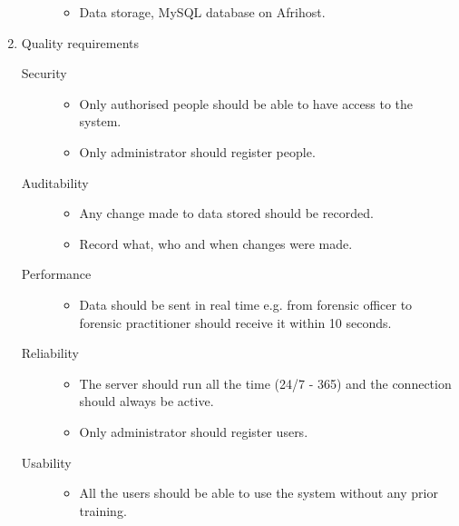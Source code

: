 \documentclass[10pt,a4paper]{article}
\begin{document}
\begin{enumerate}
\begin{description}
\begin{itemize}
\item Data storage, MySQL database on Afrihost.
\end{itemize}

\end{description}


\item Quality requirements

\begin{description}
\item [Security]

\begin{itemize}
\item Only authorised people should be able to have access to the system.
\item Only administrator should register people.
\end{itemize}

\item [Auditability]

\begin{itemize}
\item Any change made to data stored should be recorded.
\item Record what, who and when changes were made.
\end{itemize}

\item [Performance]

\begin{itemize}
\item Data should be sent in real time e.g. from forensic officer to forensic practitioner should receive it within 10 seconds.
\end{itemize}

\item [Reliability]

\begin{itemize}
\item The server should run all the time (24/7 - 365) and the connection should always be active.
\item Only administrator should register users.
\end{itemize}

\item [Usability]

\begin{itemize}
\item All the users should be able to use the system without any prior training.
\end{itemize}


\end{description}
\end{enumerate}
\end{document}
